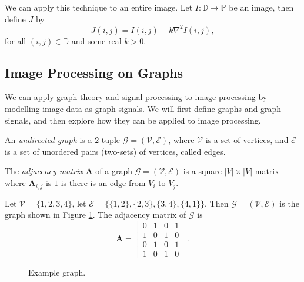 \documentclass[12pt]{article}
\begin{document}
We can apply this technique to an entire image. Let $I: \mathbb{D} \to \mathbb{P}$ be an image, then define $J$ by \[J(i, j) = I(i, j) - k\nabla^2I(i, j),\] for all $(i, j) \in \mathbb{D}$ and some real $k > 0$.

\subsection{Image Processing on Graphs}

We can apply graph theory and signal processing to image processing by modelling image data as graph signals. We will first define graphs and graph signals, and then explore how they can be applied to image processing.

\begin{defn}
    An \emph{undirected graph} is a $2$-tuple $\mathcal{G} = (\mathcal{V}, \mathcal{E})$, where $\mathcal{V}$ is a set of vertices, and $\mathcal{E}$ is a set of unordered pairs (two-sets) of vertices, called edges.
\end{defn}

\begin{defn}
    The \emph{adjacency matrix} $\bm{A}$ of a graph $\mathcal{G} = (\mathcal{V}, \mathcal{E})$ is a square $|V| \times |V|$ matrix where $\bm{A}_{i, j}$ is $1$ is there is an edge from $V_i$ to $V_j$.
\end{defn}

\begin{exmp}
    Let $\mathcal{V} = \{1, 2, 3, 4\}$, let $\mathcal{E} = \{\{1, 2\}, \{2, 3\}, \{3, 4\}, \{4, 1\}\}$. Then $\mathcal{G} = (\mathcal{V}, \mathcal{E})$ is the graph shown in Figure \ref{fig:example-graph}. The adjacency matrix of $\mathcal{G}$ is
    \[\bm{A} = \begin{bmatrix}
        0 & 1 & 0 & 1 \\
        1 & 0 & 1 & 0 \\
        0 & 1 & 0 & 1 \\
        1 & 0 & 1 & 0
    \end{bmatrix}.\]
\end{exmp}

\begin{figure}[ht!]
    \centering
\caption{Example graph.}
\label{fig:example-graph}
\end{figure}
\end{document}

